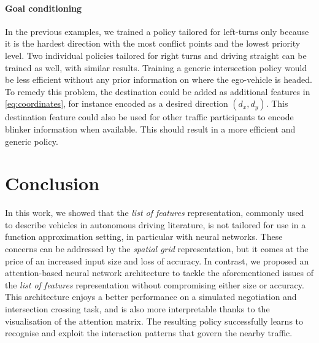 \paragraph{Goal conditioning}

In the previous examples, we trained a policy tailored for left-turns only because it is the hardest direction with the most conflict points and the lowest priority level. Two individual policies tailored for right turns and driving straight can be trained as well, with similar results. Training a generic intersection policy would be less efficient without any prior information on where the ego-vehicle is headed. To remedy this problem, the destination could be added as additional features in \eqref{eq:coordinates}, for instance encoded as a desired direction $(d_x, d_y)$. This destination feature could also be used for other traffic participants to encode blinker information when available. This should result in a more efficient and generic policy.

\section{Conclusion}

In this work, we showed that the \emph{list of features} representation, commonly used to describe vehicles in autonomous driving literature, is not tailored for use in a function approximation setting, in particular with neural networks. These concerns can be addressed by the \emph{spatial grid} representation, but it comes at the price of an increased input size and loss of accuracy. In contrast, we proposed an attention-based neural network architecture to tackle the aforementioned issues of the \emph{list of features} representation without compromising either size or accuracy. This architecture enjoys a better performance on a simulated negotiation and intersection crossing task, and is also more interpretable thanks to the visualisation of the attention matrix. The resulting policy successfully learns to recognise and exploit the interaction patterns that govern the nearby traffic.
